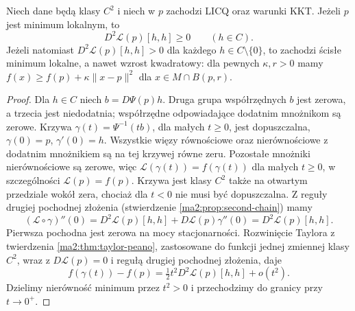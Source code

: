 \begin{twierdzenie}
\label{ma2:thm:kkt-second}
Niech dane będą klasy $C^2$ i niech w $p$ zachodzi
LICQ oraz warunki KKT. Jeżeli $p$ jest minimum
lokalnym, to
\[
 D^2\mathcal L(p)[h,h]\ge0\qquad(h\in C).
\]
Jeżeli natomiast $D^2\mathcal L(p)[h,h]>0$ dla
każdego $h\in C\setminus\{0\}$, to zachodzi
ścisłe minimum lokalne, a nawet wzrost kwadratowy:
dla pewnych $\kappa,r>0$ mamy
$f(x)\ge f(p)+\kappa\|x-p\|^2$ dla
$x\in M\cap B(p,r)$.
\end{twierdzenie}
\begin{proof}
Dla $h\in C$ niech $b=D\Psi(p)h$.
Druga grupa współrzędnych $b$ jest zerowa, a trzecia
jest niedodatnia; współrzędne odpowiadające dodatnim
mnożnikom są zerowe. Krzywa
$\gamma(t)=\Psi^{-1}(tb)$, dla małych $t\ge0$,
jest dopuszczalna, $\gamma(0)=p$, $\gamma'(0)=h$.
Wszystkie więzy równościowe oraz nierównościowe
z dodatnim mnożnikiem są na tej krzywej równe zeru.
Pozostałe mnożniki nierównościowe są zerowe, więc
$\mathcal L(\gamma(t))=f(\gamma(t))$ dla małych $t\ge0$,
w szczególności $\mathcal L(p)=f(p)$.
Krzywa jest klasy $C^2$ także na otwartym przedziale
wokół zera, chociaż dla $t<0$ nie musi być dopuszczalna.
Z reguły drugiej pochodnej złożenia
(stwierdzenie \ref{ma2:prop:second-chain}) mamy
\[
 (\mathcal L\circ\gamma)''(0)=
 D^2\mathcal L(p)[h,h]+D\mathcal L(p)\gamma''(0)
 =D^2\mathcal L(p)[h,h].
\]
Pierwsza pochodna jest zerowa na mocy stacjonarności.
Rozwinięcie Taylora z twierdzenia
\ref{ma2:thm:taylor-peano}, zastosowane do
funkcji jednej zmiennej klasy $C^2$, wraz z
$D\mathcal L(p)=0$ i regułą drugiej pochodnej
złożenia, daje
\[
 f(\gamma(t))-f(p)
   =\tfrac12 t^2 D^2\mathcal L(p)[h,h]+o(t^2).
\]
Dzielimy nierówność minimum przez $t^2>0$
i przechodzimy do granicy przy $t\to0^+$.


\end{proof}
